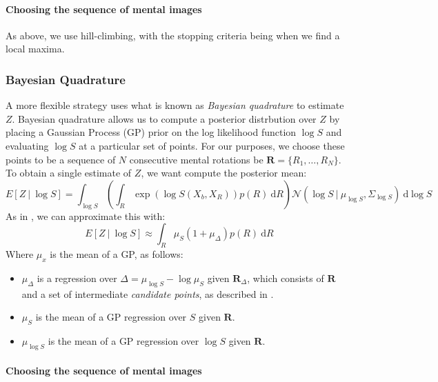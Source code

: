\documentclass{article} %
\begin{document}
\paragraph{Choosing the sequence of mental images}

As above, we use hill-climbing, with the stopping criteria being when
we find a local maxima.

\subsubsection{Bayesian Quadrature}

A more flexible strategy uses what is known as \emph{Bayesian
  quadrature} \cite{Diaconis:1988uo,OHagan:1991tx} to estimate $Z$.
Bayesian quadrature allows us to compute a posterior distrbution over
$Z$ by placing a Gaussian Process (GP) \cite{Rasmussen:2006vz} prior
on the log likelihood function $\log S$ and evaluating $\log S$ at a
particular set of points. For our purposes, we choose these points to
be a sequence of $N$ consecutive mental rotations be
$\mathbf{R}=\{R_1, \ldots{}, R_N\}$. To obtain a single estimate of
$Z$, we want compute the posterior mean:
\begin{equation}
  E[Z\ \vert \ \log S]=\int_{\log S}\left(\int_R \exp(\log{S(X_b,X_R)})p(R)\ \mathrm{d}R\right)\mathcal{N}\left(\log{S}\ \vert \ \mu_{\log S}, \Sigma_{\log S}\right)\ \mathrm{d}\log S
\end{equation}
As in \cite{Osborne:2012tm}, we can approximate this with:
\begin{equation}
  E[Z\ \vert \ \log S] \approx \int_R \mu_{S}(1 + \mu_\Delta) p(R)\ \mathrm{d}R
\end{equation} 
Where $\mu_x$ is the mean of a GP, as follows:

\begin{itemize}
\itemsep1pt\parskip0pt
\item $\mu_\Delta$ is a regression over $\Delta=\mu_{\log S} - \log
  \mu_S$ given $\mathbf{R}_\Delta$, which consists of $\mathbf{R}$ and
  a set of intermediate \emph{candidate points}, as described in
  \cite{Osborne:2012tm}.
\item $\mu_S$ is the mean of a GP regression over $S$ given
  $\mathbf{R}$.
\item $\mu_{\log S}$ is the mean of a GP regression over $\log S$
  given $\mathbf{R}$.
\end{itemize}

\paragraph{Choosing the sequence of mental images}
\end{document}
